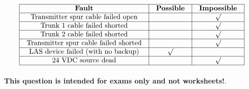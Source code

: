 






$$\vbox{\offinterlineskip
\halign{\strut
\vrule \quad\hfil # \ \hfil & 
\vrule \quad\hfil # \ \hfil & 
\vrule \quad\hfil # \ \hfil \vrule \cr
\noalign{\hrule}
%
{\bf Fault} & {\bf Possible} & {\bf Impossible} \cr
%
%
%
%
%
\noalign{\hrule}
%
Transmitter spur cable failed open &  & $\surd$ \cr
%
%
%
\noalign{\hrule}
%
Trunk 1 cable failed shorted &  & $\surd$ \cr
%
\noalign{\hrule}
%
Trunk 2 cable failed shorted &  & $\surd$ \cr
%
%
%
%
%
\noalign{\hrule}
%
Transmitter spur cable failed shorted &  & $\surd$ \cr
%
\noalign{\hrule}
%
LAS device failed (with no backup) & $\surd$ &  \cr
%
\noalign{\hrule}
%
24 VDC source dead &  & $\surd$ \cr
%
\noalign{\hrule}
} %
}$$ %







{\bf This question is intended for exams only and not worksheets!}.


